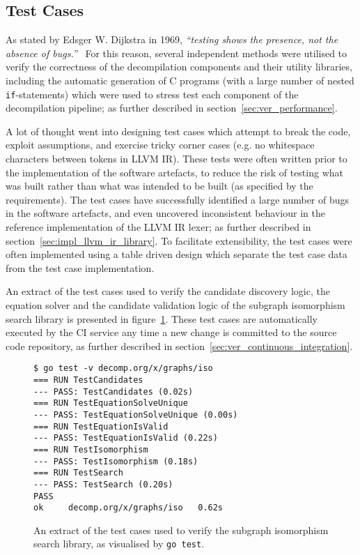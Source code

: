 
\subsection{Test Cases}

As stated by Edsger W. Dijkstra in 1969, \textit{``testing shows the presence, not the absence of bugs.''}~\cite{absence_of_bugs_quote} For this reason, several independent methods were utilised to verify the correctness of the decompilation components and their utility libraries, including the automatic generation of C programs (with a large number of nested \texttt{if}-statements) which were used to stress test each component of the decompilation pipeline; as further described in section~\ref{sec:ver_performance}.

A lot of thought went into designing test cases which attempt to break the code, exploit assumptions, and exercise tricky corner cases (e.g. no whitespace characters between tokens in LLVM IR). These tests were often written prior to the implementation of the software artefacts, to reduce the risk of testing what was built rather than what was intended to be built (as specified by the requirements). The test cases have successfully identified a large number of bugs in the software artefacts, and even uncovered inconsistent behaviour in the reference implementation of the LLVM IR lexer; as further described in section~\ref{sec:impl_llvm_ir_library}. To facilitate extensibility, the test cases were often implemented using a table driven design which separate the test case data from the test case implementation.

An extract of the test cases used to verify the candidate discovery logic, the equation solver and the candidate validation logic of the subgraph isomorphism search library is presented in figure~\ref{fig:iso_test_cases}. These test cases are automatically executed by the CI service any time a new change is committed to the source code repository, as further described in section~\ref{sec:ver_continuous_integration}.

\begin{figure}[htbp]
	\begin{center}
		\begin{verbatim}
$ go test -v decomp.org/x/graphs/iso
=== RUN TestCandidates
--- PASS: TestCandidates (0.02s)
=== RUN TestEquationSolveUnique
--- PASS: TestEquationSolveUnique (0.00s)
=== RUN TestEquationIsValid
--- PASS: TestEquationIsValid (0.22s)
=== RUN TestIsomorphism
--- PASS: TestIsomorphism (0.18s)
=== RUN TestSearch
--- PASS: TestSearch (0.20s)
PASS
ok     decomp.org/x/graphs/iso   0.62s
		\end{verbatim}
		\caption{An extract of the test cases used to verify the subgraph isomorphism search library, as visualised by \texttt{go test}.}
		\label{fig:iso_test_cases}
	\end{center}
\end{figure}



